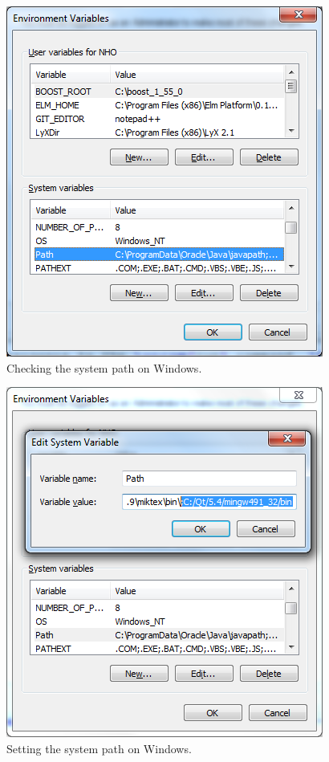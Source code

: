 \begin{figure}
\centering
\includegraphics[scale=0.8]{graphics/set-system-path-1}
\caption{Checking the system path on Windows.}
\label{fig:set-system-path-1}
\end{figure}

\begin{figure}
\centering
\includegraphics[scale=0.8]{graphics/set-system-path-2}
\caption{Setting the system path on Windows.}
\label{fig:set-system-path-2}
\end{figure}

